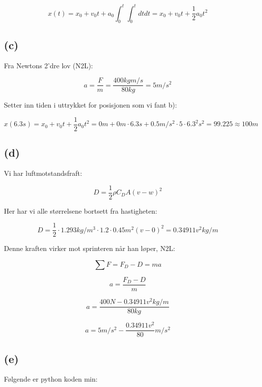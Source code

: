\documentclass[a4paper,norsk,12pt]{article}
\begin{document}
$$ x(t) = x_0 + v_0 t + a_0 \int_0^t \int_0^t dt dt = x_0 + v_0 t + \dfrac{1}{2} a_0 t^2$$


\subsection*{(c)} 

\noindent

Fra Newtons 2'dre lov (N2L):

$$ a = \dfrac{F}{m} = \dfrac{400 kg m/s}{80kg} = 5 m/s^2  $$


Setter inn tiden i uttrykket for posisjonen som vi fant b):

$$ x(6.3s) =  x_0 + v_0 t + \dfrac{1}{2} a_0 t^2 = 0 m + 0 m \cdot 6.3s + 0.5 m/s^2 \cdot 5 \cdot 6.3^2 s^2 = 99.225 \approx 100 m$$


\subsection*{(d)}

\noindent

Vi har luftmotstandsfraft:

\begin{equation}
	D = \dfrac{1}{2} \rho C_D A (v - w)^2
\end{equation}



Her har vi alle størrelsene bortsett fra hastigheten:

$$ D = \dfrac{1}{2} \cdot 1.293 kg/m^3 \cdot 1.2 \cdot 0.45 m^2 (v - 0)^2 = 0.34911 v^2 kg/m $$

Denne kraften virker mot sprinteren når han løper, N2L:

$$ \sum F = F_D - D = ma $$

$$ a = \dfrac{F_D- D}{m}$$

$$ a = \dfrac{400 N - 0.34911 v^2 kg/m}{80 kg} $$

$$ a = 5 m/s^2  - \dfrac{0.34911 v^2 }{80} m/s^2 $$

\newpage
\subsection*{(e)}

Følgende er python koden min:


\end{document}
